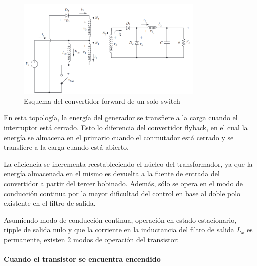 \begin{figure}[ht]
    \centering
    \includegraphics[width=0.8\textwidth]{../images/hart/conversor_forward.png}
    \caption{Esquema del convertidor forward de un solo switch}
    \label{fig:conversor_forward}
\end{figure}

En esta topología, la energía del generador se transfiere a la carga cuando el interruptor está cerrado.
Esto lo diferencia del convertidor flyback, en el cual la energía se almacena en el primario cuando el conmutador está cerrado y se transfiere a la carga cuando está abierto.

La eficiencia se incrementa reestableciendo el núcleo del transformador,
ya que la energía almacenada en el mismo es devuelta a la fuente de entrada del convertidor a partir del tercer bobinado. 
Además, sólo se opera en el modo de conducción continua por la mayor dificultad del control en base al doble polo existente en el filtro de salida. 

Asumiendo modo de conducción continua, operación en estado estacionario, ripple de salida nulo 
y que la corriente en la inductancia del filtro de salida $L_x$ es permanente, existen 2 modos de operación del transistor:


\paragraph{Cuando el transistor se encuentra encendido}

